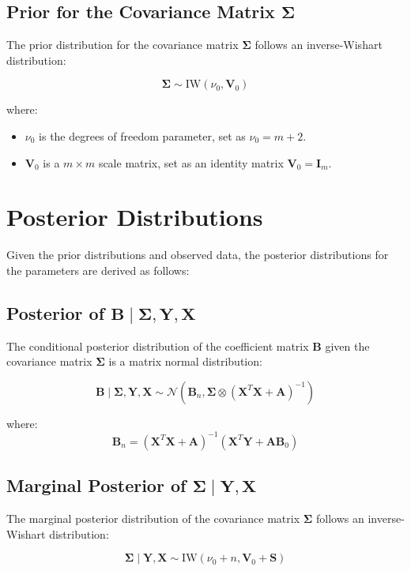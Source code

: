 \documentclass{article}
\begin{document}
\subsection{Prior for the Covariance Matrix \(\bm{\Sigma}\)}

The prior distribution for the covariance matrix \(\bm{\Sigma}\) follows an inverse-Wishart distribution:

\[
\bm{\Sigma} \sim \text{IW}(\nu_0, \bm{V}_0)
\]

where:
\begin{itemize}
    \item \(\nu_0\) is the degrees of freedom parameter, set as \(\nu_0 = m + 2\).
    \item \(\bm{V}_0\) is a \(m \times m\) scale matrix, set as an identity matrix \(\bm{V}_0 = \bm{I}_m\).
\end{itemize}

\section{Posterior Distributions}

Given the prior distributions and observed data, the posterior distributions for the parameters are derived as follows:

\subsection{Posterior of \(\bm{B} \mid \bm{\Sigma}, \bm{Y}, \bm{X}\)}

The conditional posterior distribution of the coefficient matrix \(\bm{B}\) given the covariance matrix \(\bm{\Sigma}\) is a matrix normal distribution:

\[
\bm{B} \mid \bm{\Sigma}, \bm{Y}, \bm{X} \sim \mathcal{N}(\bm{B}_n, \bm{\Sigma} \otimes (\bm{X}^T \bm{X} + \bm{A})^{-1})
\]

where:
\[
\bm{B}_n = (\bm{X}^T \bm{X} + \bm{A})^{-1} (\bm{X}^T \bm{Y} + \bm{A} \bm{B}_0)
\]

\subsection{Marginal Posterior of \(\bm{\Sigma} \mid \bm{Y}, \bm{X}\)}

The marginal posterior distribution of the covariance matrix \(\bm{\Sigma}\) follows an inverse-Wishart distribution:

\[
\bm{\Sigma} \mid \bm{Y}, \bm{X} \sim \text{IW}(\nu_0 + n, \bm{V}_0 + \bm{S})
\]
\end{document}
